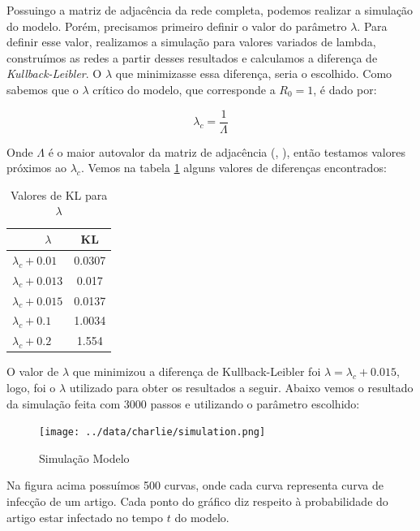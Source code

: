 \documentclass[a4paper,12pt]{article}
\begin{document}
Possuingo a matriz de adjacência da rede completa, podemos realizar a simulação do modelo. Porém, precisamos primeiro definir o valor do 
parâmetro $\lambda$. Para definir esse valor, realizamos a simulação para valores variados de lambda, construímos as redes a partir desses
resultados e calculamos a diferença de \textit{Kullback-Leibler}. O $\lambda$ que minimizasse essa diferença, seria o escolhido. Como sabemos
que o $\lambda$ crítico do modelo, que corresponde a $R_{0}=1$, é dado por: 

$$\lambda_{c} = \dfrac{1}{\Lambda}$$

Onde $\Lambda$ é o maior autovalor da matriz de adjacência (\cite{wang2003proceedings}, \cite{chakrabarti2008epidemic}), então testamos
valores próximos ao $\lambda_{c}$. Vemos na tabela \ref{tabela:dist_kl} alguns valores de diferenças encontrados:


\begin{table}[ht]
\caption{Valores de KL para $\lambda$}
\label{tabela:dist_kl}
 \begin{center}
 \begin{tabular}{l|c}
   \ \ \ \ \ $\lambda$ & KL \\ \hline
   $\lambda_{c} + 0.01$ & 0.0307\\
   $\lambda_{c} + 0.013$ & 0.017 \\
   $\lambda_{c} + 0.015$ & 0.0137\\
   $\lambda_{c} + 0.1$ & 1.0034\\
   $\lambda_{c} + 0.2$ & 1.554
 \end{tabular}
 \end{center}
\end{table}



O valor de $\lambda$ que minimizou a diferença de Kullback-Leibler foi $\lambda= \lambda_{c} + 0.015$, logo, foi o $\lambda$ utilizado para obter os
resultados a seguir. Abaixo vemos o resultado da simulação feita com 3000 passos e utilizando o parâmetro escolhido:


\begin{figure}[ht]
 \centering
 \texttt{[image: ../data/charlie/simulation.png]}
 \caption{Simulação Modelo}
\end{figure}

Na figura acima possuímos 500 curvas, onde cada curva representa curva de infecção de um artigo. Cada ponto do gráfico diz
respeito à probabilidade do artigo estar infectado no tempo $t$ do modelo. 
\end{document}
